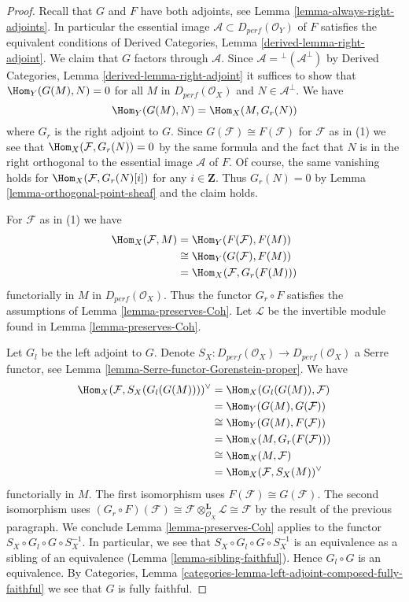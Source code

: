 \begin{proof}
Recall that $G$ and $F$ have both adjoints, see
Lemma \ref{lemma-always-right-adjoints}. In particular
the essential image $\mathcal{A} \subset D_{perf}(\mathcal{O}_Y)$ of $F$
satisfies the equivalent conditions of
Derived Categories, Lemma \ref{derived-lemma-right-adjoint}.
We claim that $G$ factors through $\mathcal{A}$.
Since $\mathcal{A} = {}^\perp(\mathcal{A}^\perp)$ by
Derived Categories, Lemma \ref{derived-lemma-right-adjoint}
it suffices to show that $\Hom_Y(G(M), N) = 0$ for
all $M$ in $D_{perf}(\mathcal{O}_X)$ and $N \in \mathcal{A}^\perp$.
We have
$$
\Hom_Y(G(M), N) = \Hom_X(M, G_r(N))
$$
where $G_r$ is the right adjoint to $G$. Since
$G(\mathcal{F}) \cong F(\mathcal{F})$ for $\mathcal{F}$ as in (1)
we see that $\Hom_X(\mathcal{F}, G_r(N)) = 0$ by the same formula
and the fact that $N$ is in the right orthogonal to the essential
image $\mathcal{A}$ of $F$. Of course, the
same vanishing holds for $\Hom_X(\mathcal{F}, G_r(N)[i])$
for any $i \in \mathbf{Z}$. Thus $G_r(N) = 0$ by
Lemma \ref{lemma-orthogonal-point-sheaf}
and the claim holds.

\medskip\noindent
For $\mathcal{F}$ as in (1) we have
\begin{align*}
\Hom_X(\mathcal{F}, M)
& =
\Hom_Y(F(\mathcal{F}), F(M)) \\
& \cong
\Hom_Y(G(\mathcal{F}), F(M)) \\
& =
\Hom_X(\mathcal{F}, G_r(F(M)))
\end{align*}
functorially in $M$ in $D_{perf}(\mathcal{O}_X)$. Thus the functor
$G_r \circ F$ satisfies the assumptions of Lemma \ref{lemma-preserves-Coh}.
Let $\mathcal{L}$ be the invertible module found in
Lemma \ref{lemma-preserves-Coh}.

\medskip\noindent
Let $G_l$ be the left adjoint to $G$. Denote
$S_X : D_{perf}(\mathcal{O}_X) \to D_{perf}(\mathcal{O}_X)$
a Serre functor, see Lemma \ref{lemma-Serre-functor-Gorenstein-proper}.
We have
\begin{align*}
\Hom_X(\mathcal{F}, S_X(G_l(G(M))) )^\vee
& =
\Hom_X(G_l(G(M)), \mathcal{F}) \\
& =
\Hom_Y(G(M), G(\mathcal{F})) \\
& \cong
\Hom_Y(G(M), F(\mathcal{F})) \\
& =
\Hom_X(M, G_r(F(\mathcal{F}))) \\
& \cong
\Hom_X(M, \mathcal{F}) \\
& =
\Hom_X(\mathcal{F}, S_X(M))^\vee
\end{align*}
functorially in $M$. The first isomorphism uses
$F(\mathcal{F}) \cong G(\mathcal{F})$.
The second isomorphism uses $(G_r \circ F)(\mathcal{F}) \cong
\mathcal{F} \otimes_{\mathcal{O}_X}^\mathbf{L} \mathcal{L} \cong \mathcal{F}$
by the result of the previous paragraph.
We conclude Lemma \ref{lemma-preserves-Coh} applies to
the functor $S_X \circ G_l \circ G \circ S_X^{-1}$.
In particular, we see that $S_X \circ G_l \circ G \circ S_X^{-1}$
is an equivalence as a sibling of an equivalence
(Lemma \ref{lemma-sibling-faithful}). Hence
$G_l \circ G$ is an equivalence. By
Categories, Lemma \ref{categories-lemma-left-adjoint-composed-fully-faithful}
we see that $G$ is fully faithful.


\end{proof}
